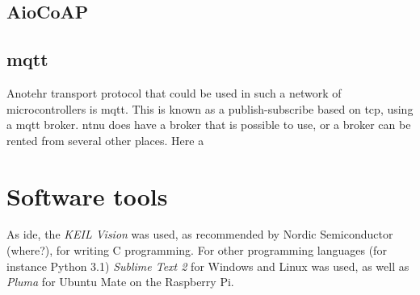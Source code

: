 \subsection{AioCoAP}



\subsection{\gls{mqtt}}

Anotehr transport protocol that could be used in such a network of microcontrollers is \gls{mqtt}. This is  known as a publish-subscribe based on \gls{tcp}, using a \gls{mqtt} broker. \gls{ntnu} does have a broker that is possible to use, or a broker can be rented from several other places. Here a 

\cite{hunkeler2008mqtt}

\section{Software tools}

As \gls{ide}, the \textit{KEIL Vision} was used, as recommended by Nordic Semiconductor (where?), for writing C programming. For other programming languages (for instance Python 3.1) \textit{Sublime Text 2} for Windows and Linux was used, as well as \textit{Pluma} for Ubuntu Mate on the Raspberry Pi. 







